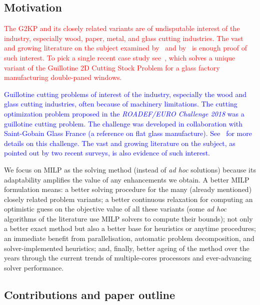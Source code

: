 \documentclass[smallextended]{svjour3}       %
\newif\iffinalversion
\newcommand{\newtext}[1]{\iffinalversion%
#1%
\else%
\textcolor{blue}{#1}%
\fi%
}
\newcommand{\oldtext}[1]{\iffinalversion%
#1%
\else%
\textcolor{red}{#1}%
\fi%
}
\begin{document}
\subsection{Motivation}

\oldtext{The G2KP and its closely related variants are of undisputable interest of the industry, especially wood, paper, metal, and glass cutting industries. The vast and growing literature on the subject examined by~\cite{iori:2020} and by~\cite{russo:2020} is enough proof of such interest.
To pick a single recent case study see~\cite{clautiaux:2019}, which solves a unique variant of the Guillotine 2D Cutting Stock Problem for a glass factory manufacturing double-paned windows.}

\newtext{Guillotine cutting problems of interest of the industry, especially the wood\cite{yanasse:linear:2008,morabito:hardboard:2007} and glass cutting industries\cite{clautiaux:2019,parreno:2020}, often because of machinery limitations. The cutting optimization problem proposed in the \emph{ROADEF/EURO Challenge 2018} was a guillotine cutting problem. The challenge was developed in collaboration with Saint-Gobain Glass France (a reference on flat glass manufacture). See~\cite{parreno:2020} for more details on this challenge. The vast and growing literature on the subject, as pointed out by two recent surveys\cite{iori:2020,russo:2020}, is also evidence of such interest.}

We focus on MILP as the solving method (instead of \emph{ad hoc} solutions) because its adaptability amplifies the value of any enhancements we obtain.
A better MILP formulation means:
a better solving procedure for the many (already mentioned) closely related problem variants;
a better continuous relaxation for computing an optimistic guess on the objective value of all these variants (some \emph{ad hoc} algorithms of the literature use MILP solvers to compute their bounds);
not only a better exact method but also a better base for heuristics or anytime procedures;
an immediate benefit from parallelisation, automatic problem decomposition, and solver-implemented heuristics;
and, finally, better ageing of the method over the years through the current trends of multiple-cores processors and ever-advancing solver performance.

\subsection{Contributions and paper outline}
\end{document}
